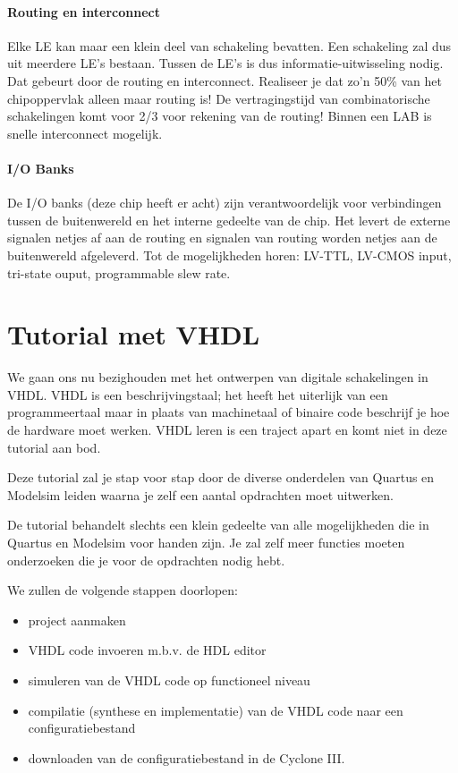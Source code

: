 \documentclass[a4paper,12pt,fleqn,twoside]{book}
\begin{document}
\subsubsection{Routing en interconnect}
Elke LE kan maar een klein deel van schakeling bevatten. Een schakeling zal dus
uit meerdere LE's bestaan. Tussen de LE's is dus informatie-uitwisseling nodig.
Dat gebeurt door de routing en interconnect. Realiseer je dat zo'n 50\% van het
chipoppervlak alleen maar routing is! De vertragingstijd van combinatorische
schakelingen komt voor 2/3 voor rekening van de routing! Binnen een LAB is
snelle interconnect mogelijk.

\subsubsection{I/O Banks}
De I/O banks (deze chip heeft er acht) zijn verantwoordelijk voor verbindingen
tussen de buitenwereld en het interne gedeelte van de chip. Het levert de
externe signalen netjes af aan de routing en signalen van routing worden netjes
aan de buitenwereld afgeleverd. Tot de mogelijkheden horen: LV-TTL, LV-CMOS
input, tri-state ouput, programmable slew rate.


\chapter{Tutorial met VHDL}
\label{chap:tutorial}
We gaan ons nu bezighouden met het ontwerpen van digitale schakelingen in VHDL.
VHDL is een beschrijvingstaal; het heeft het uiterlijk van een programmeertaal
maar in plaats van machinetaal of binaire code beschrijf je hoe de hardware
moet werken. VHDL leren is een traject apart en komt niet in deze tutorial aan
bod.

Deze tutorial zal je stap voor stap door de diverse onderdelen van Quartus en
Modelsim leiden waarna je zelf een aantal opdrachten moet uitwerken.

De tutorial behandelt slechts een klein gedeelte van alle mogelijkheden die in
Quartus en Modelsim voor handen zijn. Je zal zelf meer functies moeten
onderzoeken die je voor de opdrachten nodig hebt.

We zullen de volgende stappen doorlopen:

\begin{itemize}\itemsep-1pt
\item project aanmaken
\item VHDL code invoeren m.b.v. de HDL editor
\item simuleren van de VHDL code op functioneel niveau 
\item compilatie (synthese en implementatie) van de VHDL code naar een
      configuratiebestand
\item downloaden van de configuratiebestand in de Cyclone III.
\end{itemize}
\end{document}
